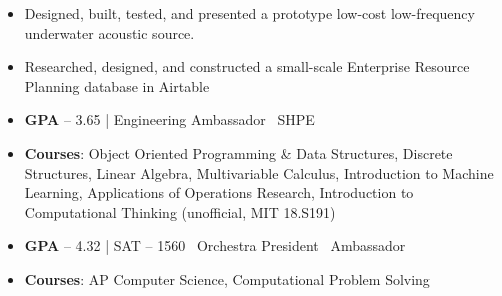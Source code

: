 \documentclass[10pt,a4paper,ragged2e]{altacv}
\begin{document}

\begin{itemize}
\item Designed, built, tested, and presented a prototype low-cost low-frequency underwater acoustic source.
\end{itemize}

\divider{}

\begin{itemize}
\item Researched, designed, and constructed a small-scale Enterprise Resource Planning database in Airtable
\end{itemize}

%



\begin{itemize}
\item \textbf{GPA} – 3.65 | Engineering Ambassador \textbullet \, SHPE
\item \textbf{Courses}: Object Oriented Programming \& Data Structures, Discrete Structures, Linear Algebra, Multivariable Calculus, Introduction to Machine Learning, Applications of Operations Research, Introduction to Computational Thinking (unofficial, MIT 18.S191)
\end{itemize}

\divider{}

\begin{itemize}
\item \textbf{GPA} – 4.32 | SAT – 1560 \textbullet \, Orchestra President \textbullet \, Ambassador
\item \textbf{Courses}: AP Computer Science, Computational Problem Solving
\end{itemize}
\end{document}
